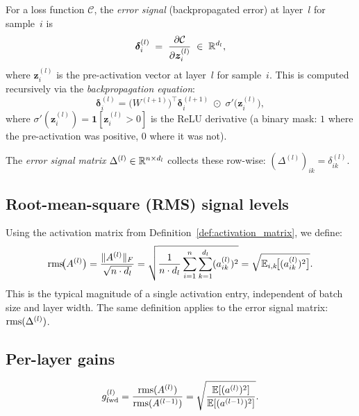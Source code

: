 \begin{definition}
\label{def:error_signal}
For a loss function $\mathcal{C}$, the \emph{error signal}
(backpropagated error) at layer~$l$ for sample~$i$ is
\[
  \bm{\delta}^{(l)}_i
  \;=\; \frac{\partial \mathcal{C}}{\partial \bm{z}^{(l)}_i}
  \;\in\; \mathbb{R}^{d_l},
\]
where $\bm{z}^{(l)}_i$ is the pre-activation vector at layer~$l$
for sample~$i$.  This is computed recursively via the
\emph{backpropagation equation}:
\begin{equation}\label{eq:bp_recursion}
  \bm{\delta}^{(l)}_i
  = \bigl(W^{(l+1)}\bigr)^\top \bm{\delta}^{(l+1)}_i
    \;\odot\; \sigma'\!\bigl(\bm{z}^{(l)}_i\bigr),
\end{equation}
where $\sigma'(\bm{z}^{(l)}_i) = \mathbf{1}[\bm{z}^{(l)}_i > 0]$
is the ReLU derivative (a binary mask: $1$ where the pre-activation
was positive, $0$ where it was not).

The \emph{error signal matrix} $\Delta^{(l)} \in \mathbb{R}^{n \times d_l}$
collects these row-wise:
$(\Delta^{(l)})_{ik} = \delta^{(l)}_{ik}$.
\end{definition}

\subsection{Root-mean-square (RMS) signal levels}

Using the activation matrix from Definition~\ref{def:activation_matrix},
we define:
\begin{equation}\label{eq:rms}
  \operatorname{rms}\!\bigl(A^{(l)}\bigr)
  = \frac{\|A^{(l)}\|_F}{\sqrt{n \cdot d_l}}
  = \sqrt{\frac{1}{n \cdot d_l}
    \sum_{i=1}^{n}\sum_{k=1}^{d_l} (a^{(l)}_{ik})^2}
  = \sqrt{\mathbb{E}_{i,k}\!\bigl[(a^{(l)}_{ik})^2\bigr]}.
\end{equation}
This is the typical magnitude of a single activation entry, independent
of batch size and layer width.  The same definition applies to the
error signal matrix: $\operatorname{rms}(\Delta^{(l)})$.

\subsection{Per-layer gains}

\begin{definition}
\begin{equation}\label{eq:fwd_gain}
  g_{\mathrm{fwd}}^{(l)}
  = \frac{\operatorname{rms}(A^{(l)})}{\operatorname{rms}(A^{(l-1)})}
  = \sqrt{\frac{\mathbb{E}[(a^{(l)})^2]}{\mathbb{E}[(a^{(l-1)})^2]}}.
\end{equation}
\end{definition}

